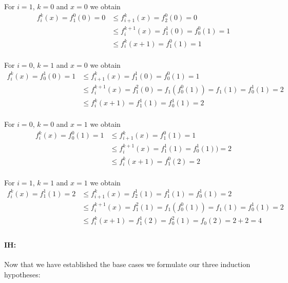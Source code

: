 \documentclass[11pt,a4paper]{article}
\begin{document}
For $i=1$, $k=0$ and $x=0$ we obtain
\begin{equation*}
\begin{split}
f_i^k(x) = f_1^0(0) = 0 
& \leq f_{i+1}^k(x) =  f_2^0(0) = 0 \\
& \leq f_i^{k+1}(x) =  f_1^1(0) =  f_0^0(1) = 1 \\
& \leq f_i^k(x+1) =  f_1^0(1) = 1 \\
\end{split}
\end{equation*}

For $i=0$, $k=1$ and $x=0$ we obtain
\begin{equation*}
\begin{split}
f_i^k(x) = f_0^1(0) = 1 
& \leq f_{i+1}^k(x) =  f_1^1(0) =  f_0^0(1) = 1 \\
& \leq f_i^{k+1}(x) =  f_1^2(0) =  f_1(f_0^0(1)) = f_1(1) = f_0^1(1)=2 \\
& \leq f_i^k(x+1) =  f_1^1(1) = f_0^1(1) = 2 \\
\end{split}
\end{equation*}

For $i=0$, $k=0$ and $x=1$ we obtain
\begin{equation*}
\begin{split}
f_i^k(x) = f_0^0(1) = 1 
& \leq f_{i+1}^k(x) =  f_1^0(1) = 1 \\
& \leq f_i^{k+1}(x) =  f_1^1(1) = f_0^1(1)) =2 \\
& \leq f_i^k(x+1) =  f_1^0(2) =  2 \\
\end{split}
\end{equation*}

For $i=1$, $k=1$ and $x=1$ we obtain
\begin{equation*}
\begin{split}
f_i^k(x) = f_1^1(1) = 2 
& \leq f_{i+1}^k(x) =  f_2^1(1) = f_1^1(1) = f_0^1(1)=2 \\
& \leq f_i^{k+1}(x) =  f_1^2(1) = f_1(f_0^0(1)) = f_1(1) = f_0^1(1)=2\\
& \leq f_i^k(x+1) =  f_1^1(2) =  f_0^2(1)= f_0(2) = 2 + 2 = 4\\
\end{split}
\end{equation*}

\paragraph{IH:} Now that we have established the base cases we formulate our three induction hypotheses: \\
\end{document}
